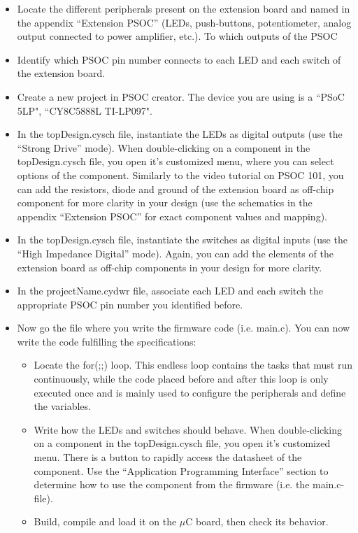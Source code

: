 \documentclass[11pt,a4paper]{article}
\theoremstyle{definition}%
\begin{document}
\begin{itemize}
	\item Locate the different peripherals present on the extension board and named in the appendix ``Extension PSOC'' (LEDs, push-buttons, potentiometer, analog output connected to power amplifier, etc.). To which outputs of the PSOC 
	\item Identify which PSOC pin number connects to each LED and each switch of the extension board. 
	\item Create a new project in PSOC creator. The device you are using is a ``PSoC 5LP", ``CY8C5888L TI-LP097".
	\item In the topDesign.cysch file, instantiate the LEDs as digital outputs (use the ``Strong Drive'' mode). When double-clicking on a component in the topDesign.cysch file, you open it's customized menu, where you can select options of the component. Similarly to the video tutorial on PSOC 101, you can add the resistors, diode and ground of the extension board as off-chip component for more clarity in your design (use the schematics in the appendix ``Extension PSOC'' for exact component values and mapping). 
	\item In the topDesign.cysch file, instantiate the switches as digital inputs (use the ``High Impedance Digital'' mode). Again, you can add the elements of the extension board as off-chip components in your design for more clarity. 
	\item In the projectName.cydwr file, associate each LED and each switch the appropriate PSOC pin number you identified before. 
	
	\item Now go the file where you write the firmware code (i.e. main.c). You can now write the code fulfilling the specifications: 
	\begin{itemize}
		\item Locate the for(;;) loop.
        This endless loop contains the tasks that must run continuously, while the code placed before and after this loop is only executed once and is mainly used to configure the peripherals and define the variables.
		\item Write how the LEDs and switches should behave. When double-clicking on a component in the topDesign.cysch file, you open it's customized menu. There is a button to rapidly access the datasheet of the component. Use the ``Application Programming Interface'' section to determine how to use the component from the firmware (i.e. the main.c-file). 
		\item Build, compile and load it on the $\mu$C board, then check its behavior.
	\end{itemize}
\end{itemize}
\end{document}
